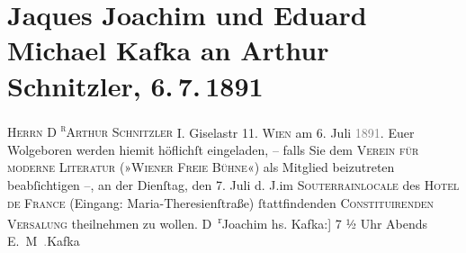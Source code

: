 

         \renewcommand{\erwaehnteInstitutionen}{Institutionen: »Freie Bühne« Verein für moderne Literatur}
         \renewcommand{\erwaehnteOrte}{Orte: Hotel de France, Maria-Theresienstraße, Ordination Dr. Arthur Schnitzler Giselastraße 11, Wien, Wipplingerstraße}
         \renewcommand{\erwaehnteWerke}{}
               \section[Jaques Joachim und Eduard Michael Kafka an Arthur Schnitzler, 6. 7. 1891]{ Jaques Joachim und Eduard Michael Kafka an Arthur Schnitzler, 6. 7. 1891}\nopagebreak{}\rehead{ }\begin{ledgroupsized}[t]{13cm}\normalsize\beginnumbering \toendnotes[C]{\smallbreak\pagebreak[2]} 
\toendnotes[C]{\smallbreak}\pstart{}{\pb}\textsc{Herrn D \textsuperscript{r}Arthur Schnitzler }\pend{}\pstart{}I. Giselastr 11. \pend{}{\bigskip}\pstart
           \centering{}{\pb}\textsc{Wien} am 6. Juli \textcolor{gray}{1891}. \pend
           \pstart\center{}Euer Wolgeboren\pend\pstart
           werden hiemit höflichſt eingeladen, – falls Sie dem \pend
           \pstart
           \centering{}\textsc{Verein für moderne Literatur (»Wiener Freie Bühne«)}\pend
           \pstart
           \noindent{}als Mitglied beizutreten beabſichtigen –, an der Dienſtag, den 7.
                  Juli d. J.im \textsc{Souterrainlocale} des \textsc{Hotel de France} (Eingang: Maria-Theresienſtraße){ }ſtattfindenden \pend
           \pstart
           \centering{}\textsc{Constituirenden Versa{\geminationm}lung }\pend
           \pstart
           \noindent{}theilnehmen zu wollen.\pend
           \pstart \spacefill\mbox{D \textsuperscript{r}Joachim}\pend{}\pstart
           \noindent{}\centering{}{[}hs. Kafka:{]} 7 ½ Uhr Abends\pend
           \pstart \spacefill\mbox{E. M \textcolor{gray}{.}Kafka}\pend{}\pstart
           \noindent{}\label{T_L00022-1v}\label{T_L00022-1h}\pend
           

\end{ledgroupsized}
